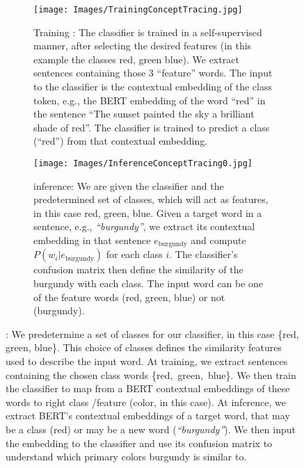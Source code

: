 \begin{figure*}[h!]
    \centering
    \begin{subfigure}[]{0.47\textwidth}
        \centering
        \label{fig:word_confusion_a}
        \texttt{[image: Images/TrainingConceptTracing.jpg]}
        \caption{Training \wc: The classifier is trained in a self-supervised manner, after selecting the desired features (in this example the classes red, green blue). We extract sentences containing those 3 ``feature'' words. The input to the classifier is the contextual embedding of the class token, e.g., the BERT embedding of the word ``red'' in the sentence ``The sunset painted the sky a brilliant shade of red''. The classifier is trained to predict a class (``red'') from that contextual embedding.}
    \end{subfigure}
\qquad
    \begin{subfigure}[]{0.47\textwidth}
        \centering
        \label{fig:word_confusion_b}
        \texttt{[image: Images/InferenceConceptTracing0.jpg]}
        \caption{\wc inference: We are given the classifier and the predetermined set of classes, which will act as features, in this case red, green, blue. 
        Given a target word in a sentence, e.g., \textit{``burgundy''}, we extract its contextual embedding in that sentence $e_{\text{burgundy}}$ and compute $P(w_i|e_{\text{burgundy}})$ for each class $i$. The classifier's confusion matrix then define the similarity of the burgundy with each class. The input word can be one of the feature words (red, green, blue) or not (burgundy).}
     \end{subfigure}
\par\medskip
    \caption{{\wc}: We predetermine a set of classes for our classifier, in this case \{red, green, blue\}. This choice of classes defines the similarity features used to describe the input word. At training, we extract sentences containing the chosen class words \{red,\ green,\ blue\}. We then train the classifier to map from a BERT contextual embeddings of these words to right class \slash feature (color, in this case). At inference, we extract BERT's contextual embeddings of a target word, that may be a class (red) or may be a new word  (\textit{``burgundy''}). We then input the embedding to the classifier and use its confusion matrix to understand which primary colors burgundy is similar to.}
    \label{fig:word_confusion}
\end{figure*}


